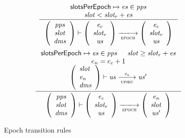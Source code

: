 \documentclass[11pt,a4paper]{article}
\newcommand{\var}[1]{\mathit{#1}}
\newcommand{\pp}[1]{\mathsf{#1}}
\newcommand{\trans}[2]{\xlongrightarrow[\textsc{#1}]{#2}}
\begin{document}
\begin{figure}[ht]
  \begin{equation*}
    \inference
    {
      \pp{slotsPerEpoch} \mapsto \var{es} \in \var{pps}
      \\
      \var{slot} < \var{slot_r} + \var{es}
    }
    {
      \left(
        {\begin{array}{c}
          \var{pps} \\
          \var{slot} \\
          \var{dms}
        \end{array}}
      \right)
      \vdash
      {
        \left(
        {\begin{array}{c}
          \var{e_c} \\
          \var{slot_r} \\
          \var{us}
         \end{array}
        }
        \right)
      }
      \trans{epoch}{}
      {
        \left(
        {\begin{array}{c}
          \var{e_c} \\
          \var{slot_r} \\
          \var{us}
         \end{array}
        }
        \right)
      }
    }
  \end{equation*}
  \vspace{20pt}
  \begin{equation*}
    \inference
    {
      \pp{slotsPerEpoch} \mapsto \var{es} \in \var{pps}
      &
      \var{slot} \geq \var{slot_r} + \var{es}
      \\
      e_n = e_c + 1
      \\
      {\left(
          \begin{array}{l}
            \var{slot} \\
            \var{e_n} \\
            \var{dms}
          \end{array}
        \right)
      }
      \vdash \var{us} \trans{upiec}{\var{e_n}} \var{us'}
    }
    {
      \left(
        {\begin{array}{c}
          \var{pps} \\
          \var{slot} \\
          \var{dms}
        \end{array}}
      \right)
      \vdash
      {
        \left(
        {\begin{array}{c}
          \var{e_c} \\
          \var{slot_r} \\
          \var{us}
         \end{array}
        }
        \right)
      }
      \trans{epoch}{}
      {
        \left(
        {\begin{array}{c}
          \var{e_n} \\
          \var{slot} \\
          \var{us'}
         \end{array}
        }
        \right)
      }
    }
  \end{equation*}
  \caption{Epoch transition rules}
  \label{fig:rules:epoch}
\end{figure}
\end{document}
